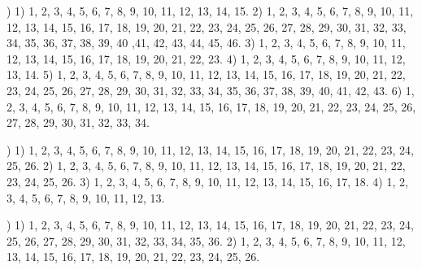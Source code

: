 \documentclass[a4paper,11pt]{article}
\begin{document}




\noindent
{}) 1) 1, 2, 3, 4, 5, 6, 7, 8, 9, 10, 11, 12, 13, 14, 15.
2) 1, 2, 3, 4, 5, 6, 7, 8, 9, 10, 11, 12, 13, 14, 15, 16, 17, 18, 19,
20, 21, 22, 23, 24, 25, 26, 27, 28, 29, 30, 31, 32, 33, 34, 35, 36, 37,
38, 39, 40 ,41, 42, 43, 44, 45, 46. 3) 1, 2, 3, 4, 5, 6, 7, 8, 9, 10,
11, 12, 13, 14, 15, 16, 17, 18, 19, 20, 21, 22, 23. 4) 1, 2, 3, 4, 5,
6, 7, 8, 9, 10, 11, 12, 13, 14. 5) 1, 2, 3, 4, 5, 6, 7, 8, 9, 10, 11,
12, 13, 14, 15, 16, 17, 18, 19, 20, 21, 22, 23, 24, 25, 26, 27, 28, 29,
30, 31, 32, 33, 34, 35, 36, 37, 38, 39, 40, 41, 42, 43. 6) 1, 2, 3, 4,
5, 6, 7, 8, 9, 10, 11, 12, 13, 14, 15, 16, 17, 18, 19, 20, 21, 22, 23,
24, 25, 26, 27, 28, 29, 30, 31, 32, 33, 34.

\vspace{\spaceFour}



\noindent
{}) 1) 1, 2, 3, 4, 5, 6, 7, 8, 9, 10, 11, 12, 13, 14, 15,
16, 17, 18, 19, 20, 21, 22, 23, 24, 25, 26. 2) 1, 2, 3, 4, 5, 6, 7, 8,
9, 10, 11, 12, 13, 14, 15, 16, 17, 18, 19, 20, 21, 22, 23, 24, 25, 26.
3) 1, 2, 3, 4, 5, 6, 7, 8, 9, 10, 11, 12, 13, 14, 15, 16, 17, 18.
4) 1, 2, 3, 4, 5, 6, 7, 8, 9, 10, 11, 12, 13.

\vspace{\spaceFour}



\noindent
{}) 1) 1, 2, 3, 4, 5, 6, 7, 8, 9, 10, 11, 12, 13, 14, 15,
16, 17, 18, 19, 20, 21, 22, 23, 24, 25, 26, 27, 28, 29, 30, 31, 32, 33,
34, 35, 36. 2) 1, 2, 3, 4, 5, 6, 7, 8, 9, 10, 11, 12, 13, 14, 15, 16, 17,
18, 19, 20, 21, 22, 23, 24, 25, 26.
\end{document}

